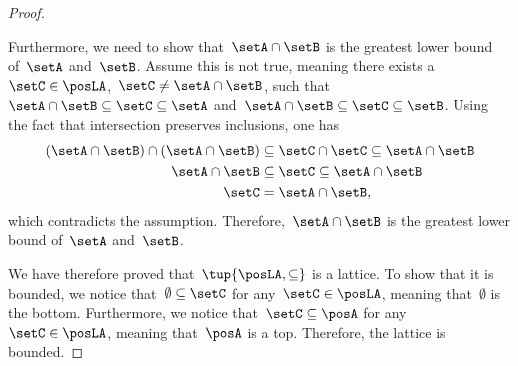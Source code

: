 \begin{proof}
\begin{compactitem}
    Furthermore, we need to show that~$\setA\cap \setB$ is the greatest lower bound of~$\setA$ and~$\setB$.
    Assume this is not true, meaning there exists a~$\setC\in \posLA$,~$\setC\neq \setA\cap \setB$, such that~$\setA\cap \setB\subseteq \setC\subseteq \setA$ and~$\setA\cap \setB\subseteq \setC\subseteq \setB$.
    Using the fact that intersection preserves inclusions, one has
    \begin{equation}
      \begin{aligned}
      (\setA\cap \setB)
        \cap (\setA\cap \setB) &\subseteq \setC \cap \setC \subseteq \setA\cap \setB\\
        \setA\cap \setB &\subseteq \setC\subseteq \setA\cap \setB\\
        \setC&=\setA\cap \setB,
      \end{aligned}
    \end{equation}
    which contradicts the assumption. Therefore,~$\setA\cap \setB$ is the greatest lower bound of~$\setA$ and~$\setB$.
  \end{compactitem}
  We have therefore proved that~$\tup{\posLA,\subseteq}$ is a lattice.
  To show that it is bounded, we notice that~$\emptyset \subseteq \setC$ for any~$\setC\in \posLA$, meaning that~$\emptyset$ is the bottom.
  Furthermore, we notice that~$\setC\subseteq \posA$ for any~$\setC\in \posLA$, meaning that~$\posA$ is a top. Therefore, the lattice is bounded.
\end{proof}